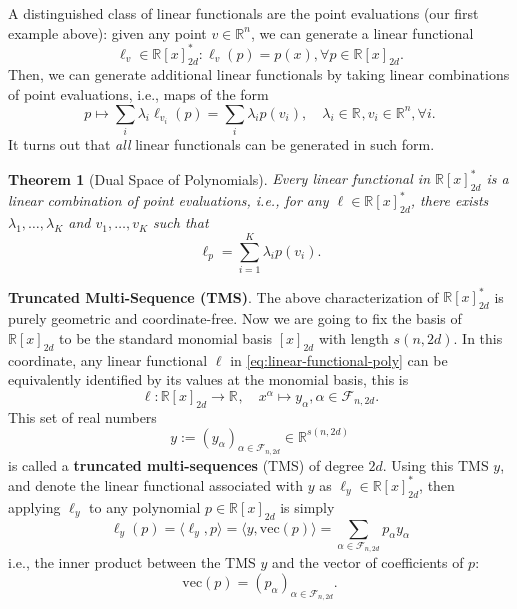\documentclass[
]{book}
\newtheorem{theorem}{Theorem}[chapter]
\theoremstyle{definition}
\theoremstyle{definition}
\theoremstyle{definition}
\theoremstyle{definition}
\theoremstyle{remark}
\begin{document}
A distinguished class of linear functionals are the point evaluations (our first example above): given any point \(v \in \mathbb{R}^{n}\), we can generate a linear functional
\[
\ell_v \in \mathbb{R}[x]^*_{2d}: \ell_v(p) = p(x), \forall p \in \mathbb{R}[x]_{2d}.
\]
Then, we can generate additional linear functionals by taking linear combinations of point evaluations, i.e., maps of the form
\[
p \mapsto \sum_{i} \lambda_i \ell_{v_i} (p) = \sum_{i} \lambda_i p(v_i), \quad \lambda_i \in \mathbb{R}^{}, v_i \in \mathbb{R}^{n}, \forall i.
\]
It turns out that \emph{all} linear functionals can be generated in such form.

\begin{theorem}[Dual Space of Polynomials]
\protect\hypertarget{thm:DualSpacePoly}{}\label{thm:DualSpacePoly}Every linear functional in \(\mathbb{R}[x]^*_{2d}\) is a linear combination of point evaluations, i.e., for any \(\ell \in \mathbb{R}[x]^*_{2d}\), there exists \(\lambda_1,\dots,\lambda_K\) and \(v_1,\dots,v_K\) such that
\[
\ell_{p} = \sum_{i=1}^K \lambda_i p(v_i).
\]
\end{theorem}

\textbf{Truncated Multi-Sequence (TMS)}. The above characterization of \(\mathbb{R}[x]^*_{2d}\) is purely geometric and coordinate-free. Now we are going to fix the basis of \(\mathbb{R}[x]_{2d}\) to be the standard monomial basis \([x]_{2d}\) with length \(s(n,2d)\). In this coordinate, any linear functional \(\ell\) in \eqref{eq:linear-functional-poly} can be equivalently identified by its values at the monomial basis, this is
\[
\ell: \mathbb{R}[x]_{2d} \rightarrow \mathbb{R}^{}, \quad x^{\alpha} \mapsto y_{\alpha}, \alpha \in \mathcal{F}_{n,2d}.
\]
This set of real numbers
\[
y:=(y_\alpha)_{\alpha \in \mathcal{F}_{n,2d}} \in \mathbb{R}^{s(n,2d)}
\] is called a \textbf{truncated multi-sequences} (TMS) of degree \(2d\). Using this TMS \(y\), and denote the linear functional associated with \(y\) as \(\ell_y \in \mathbb{R}[x]^*_{2d}\), then applying \(\ell_y\) to any polynomial \(p \in \mathbb{R}[x]_{2d}\) is simply
\[
\ell_y(p) = \langle \ell_y, p \rangle = \langle y, \mathrm{vec}(p) \rangle = \sum_{\alpha \in \mathcal{F}_{n,2d}} p_\alpha y_\alpha
\]
i.e., the inner product between the TMS \(y\) and the vector of coefficients of \(p\):
\[
\mathrm{vec}(p) = (p_\alpha)_{\alpha \in \mathcal{F}_{n,2d}}.
\]
\end{document}
